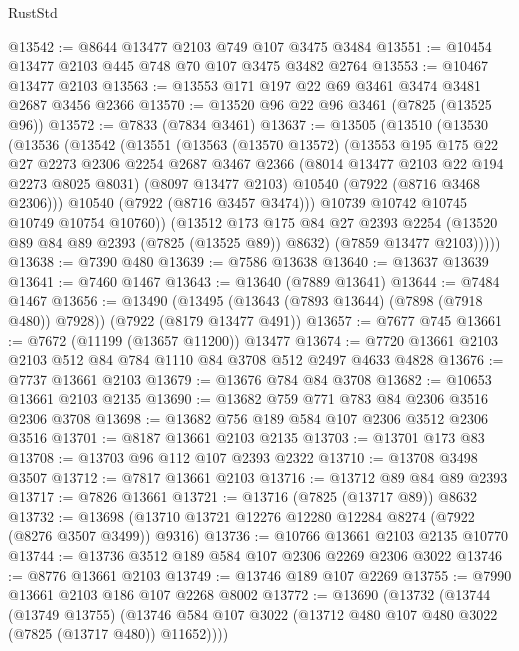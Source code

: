 \begin{lexlean}{RustStd}
\begin{coremodule}
@13542 := @8644 @13477 @2103 @749 @107 @3475 @3484
@13551 := @10454 @13477 @2103 @445 @748 @70 @107 @3475 @3482 @2764
@13553 := @10467 @13477 @2103
@13563 := @13553 @171 @197 @22 @69 @3461 @3474 @3481 @2687 @3456 @2366
@13570 := @13520 @96 @22 @96 @3461 (@7825 (@13525 @96))
@13572 := @7833 (@7834 @3461)
@13637 := @13505
    (@13510
      (@13530
        (@13536
          (@13542
            (@13551
              (@13563
                (@13570 @13572)
                (@13553
                  @195
                  @175
                  @22
                  @27
                  @2273
                  @2306
                  @2254
                  @2687
                  @3467
                  @2366
                  (@8014 @13477 @2103 @22 @194 @2273 @8025 @8031)
                  (@8097 @13477 @2103)
                  @10540
                  (@7922 (@8716 @3468 @2306)))
                @10540
                (@7922 (@8716 @3457 @3474)))
              @10739
              @10742
              @10745
              @10749
              @10754
              @10760))
          (@13512
            @173
            @175
            @84
            @27
            @2393
            @2254
            (@13520 @89 @84 @89 @2393 (@7825 (@13525 @89)) @8632)
            (@7859 @13477 @2103)))))
@13638 := @7390 @480
@13639 := @7586 @13638
@13640 := @13637 @13639
@13641 := @7460 @1467
@13643 := @13640 (@7889 @13641)
@13644 := @7484 @1467
@13656 := @13490
    (@13495 (@13643 (@7893 @13644) (@7898 (@7918 @480)) @7928))
    (@7922 (@8179 @13477 @491))
@13657 := @7677 @745
@13661 := @7672 (@11199 (@13657 @11200)) @13477
@13674 := @7720 @13661 @2103 @2103 @512 @84 @784 @1110 @84 @3708 @512 @2497 @4633 @4828
@13676 := @7737 @13661 @2103
@13679 := @13676 @784 @84 @3708
@13682 := @10653 @13661 @2103 @2135
@13690 := @13682 @759 @771 @783 @84 @2306 @3516 @2306 @3708
@13698 := @13682 @756 @189 @584 @107 @2306 @3512 @2306 @3516
@13701 := @8187 @13661 @2103 @2135
@13703 := @13701 @173 @83
@13708 := @13703 @96 @112 @107 @2393 @2322
@13710 := @13708 @3498 @3507
@13712 := @7817 @13661 @2103
@13716 := @13712 @89 @84 @89 @2393
@13717 := @7826 @13661
@13721 := @13716 (@7825 (@13717 @89)) @8632
@13732 := @13698 (@13710 @13721 @12276 @12280 @12284 @8274 (@7922 (@8276 @3507 @3499)) @9316)
@13736 := @10766 @13661 @2103 @2135 @10770
@13744 := @13736 @3512 @189 @584 @107 @2306 @2269 @2306 @3022
@13746 := @8776 @13661 @2103
@13749 := @13746 @189 @107 @2269
@13755 := @7990 @13661 @2103 @186 @107 @2268 @8002
@13772 := @13690
    (@13732
      (@13744
        (@13749 @13755)
        (@13746 @584 @107 @3022 (@13712 @480 @107 @480 @3022 (@7825 (@13717 @480)) @11652))))

\end{coremodule}
\end{lexlean}
